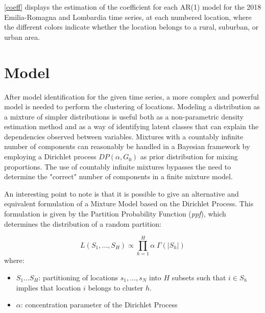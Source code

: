 \documentclass[12pt,a4paper]{article}
\begin{document}
\autoref{coeff} displays the estimation of the coefficient for each AR(1) model for the 2018 Emilia-Romagna and Lombardia time series, at each numbered location, where the different colors indicate whether the location belongs to a rural, suburban, or urban area. 
\begin{figure}[H]
\centering
  
  \caption{}
  \label{coeff}
\end{figure}

\newpage

\begin{figure}[H]
\centering
  
  \caption{}
  \label{pacf}
\end{figure}

\newpage


\section{Model}\label{sec:mod}

After model identification for the given time series, a more complex and powerful model is needed to perform the clustering of locations.
Modeling a distribution as a mixture of simpler distributions is useful both as a non-parametric density estimation method and as a way of identifying latent classes that can explain the dependencies observed between variables.
Mixtures with a countably infinite number of components can reasonably be handled in a Bayesian framework by employing a Dirichlet process $DP(\alpha, G_{0})$ as prior distribution for mixing proportions. The use of countably infinite mixtures bypasses the need to determine the "correct" number of components in a finite mixture model.

An interesting point to note is that it is possible to give an alternative and equivalent formulation of a Mixture Model based on the Dirichlet Process. This formulation is given by the Partition Probability Function (\textit{ppf}), which determines the distribution of a random partition:

$$L(S_1, … ,S_H) \propto \prod_{h=1}^{H} \alpha \; \Gamma(|S_h|)$$
where:
\begin{itemize}
    \item $S_1 \dots S_H$:  partitioning of locations $s_1, \ldots, s_N$ into $H$ subsets such that $i \in S_h$ implies that location $i$ belongs to cluster $h$.    
    \item $\alpha$:  concentration parameter of the Dirichlet Process
\end{itemize}
\end{document}
